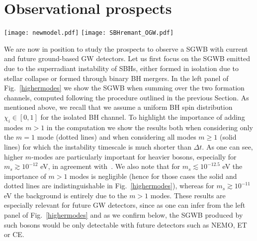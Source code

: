 \documentclass[
reprint,           %
superscriptaddress,%
amsmath,           %
amssymb,           %
aps,               %
prd,               %
notitlepage,       %
floatfix,          %
nofootinbib %
]{revtex4-1}
\begin{document}
\section{Observational prospects}
%
\begin{figure*}[htbp!]
	\centering
	\texttt{[image: newmodel.pdf]}
	\texttt{[image: SBHremant\_OGW.pdf]}
	\caption{\label{highermodes} Left panel: Stochastic GW background from scalar clouds formed around SBHs assuming a uniform initial spin  distribution $\chi_i \in [0,1]$ for BHs formed in isolation. Right panel: Same but only taking into account the contribution from BHs formed through binary SBH mergers.
%
For both panels, the dotted lines only include the mode $m=1$ while the solid lines include $m\geq 1$ with all the $m$-modes that contribute. We also plot the power-law integrated sensitivity curves~\cite{Thrane:2013oya} by assuming the threshold SNR to be $\SNR=1$.
For LIGO/NEMO/CE/ET at their design sensitivity. We assume a four-year-detection and two co-aligned and co-located identical detectors for NEMO/CE/ET, whereas for LIGO we use the overlap function computed in~\cite{Thrane:2013oya}. 
}
\end{figure*}

We are now in position to study the prospects to observe a SGWB with current and future ground-based GW detectors. Let us first focus on the SGWB emitted due to the superradiant instability of SBHs, either formed in isolation due to stellar collapse or formed through binary BH mergers.
%
In the left panel of Fig.~\ref{highermodes} we show the SGWB when summing over the two formation channels, computed following the procedure outlined in the previous Section. As mentioned above, we recall that we assume a uniform BH spin distribution $\chi_i \in [0,1]$ for the isolated BH channel. To highlight the importance of adding modes $m>1$ in the computation we show the results both when considering only the $m=1$ mode (dotted lines) and when considering all modes $m\geq 1$ (solid lines) for which the instability timescale is much shorter than $\Delta t$. As one can see, higher $m$-modes are particularly important for heavier bosons, especially for $m_s \gtrsim 10^{-12}$ eV, in agreement with~\cite{Tsukada:2020lgt}. We also note that for $m_s\lesssim 10^{-12.5}$ eV the importance of $m>1$ modes is negligible (hence for those cases the solid and dotted lines are indistinguishable in Fig.~\ref{highermodes}), whereas for $m_s\gtrsim 10^{-11}$ eV the background is entirely due to the $m>1$ modes.
These results are especially relevant for future GW detectors, since as one can infer from the left panel of Fig.~\ref{highermodes} and as we confirm below, the SGWB produced by such bosons would be only detectable with future detectors such as NEMO, ET or CE.
\end{document}

